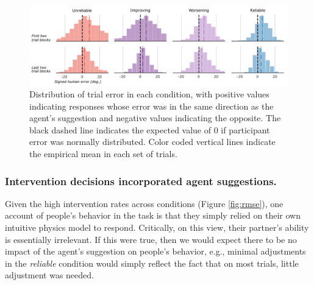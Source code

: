 \documentclass[10pt,letterpaper]{article}
\begin{document}
\begin{figure}[hbtp]
\vspace{-8mm}
\includegraphics[width=\textwidth]{img/error_distributions_clean.pdf} 
\vspace{-4mm}
\caption{Distribution of trial error in each condition, with positive values indicating responses whose error was in the same direction as the agent's suggestion and negative values indicating the opposite. The black dashed line indicates the expected value of 0 if participant error was normally distributed. Color coded vertical lines indicate the empirical mean in each set of trials.} 
\label{fig:error_histograms}
\end{figure}


\subsubsection{Intervention decisions incorporated agent suggestions.}

Given the high intervention rates across conditions (Figure \ref{fig:rmse}), one account of people's behavior in the task is that they simply relied on their own intuitive physics model to respond. Critically, on this view, their partner's ability is essentially irrelevant. If this were true, then we would expect there to be no impact of the agent's suggestion on people's behavior, e.g., minimal adjustments in the \textit{reliable} condition would simply reflect the fact that on most trials, little adjustment was needed. 
\end{document}
